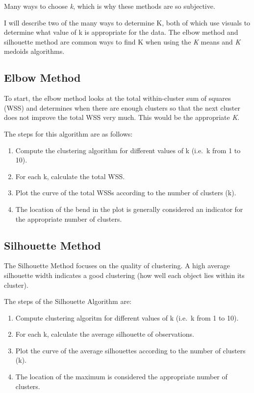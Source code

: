 \documentclass[12pt,twoside]{amherstthesis}
\providecommand{\tightlist}{%
  \setlength{\itemsep}{0pt}\setlength{\parskip}{0pt}}
\begin{document}
  Many ways to choose \emph{k}, which is why these methods are so
  subjective.
  
  I will describe two of the many ways to determine K, both of which use
  visuals to determine what value of k is appropriate for the data. The
  elbow method and silhouette method are common ways to find K when using
  the \emph{K} means and \emph{K} medoids algorithms.
  
  \subsection{Elbow Method}\label{elbow-method}
  
  To start, the elbow method looks at the total within-cluster sum of
  squares (WSS) and determines when there are enough clusters so that the
  next cluster does not improve the total WSS very much. This would be the
  appropriate \emph{K}.
  
  The steps for this algorithm are as follows:
  
  \begin{enumerate}
  \def\labelenumi{\arabic{enumi}.}
  \tightlist
  \item
    Compute the clustering algorithm for different values of k (i.e.~k
    from 1 to 10).
  \item
    For each k, calculate the total WSS.
  \item
    Plot the curve of the total WSSs according to the number of clusters
    (k).
  \item
    The location of the bend in the plot is generally considered an
    indicator for the appropriate number of clusters.
  \end{enumerate}
  
  \subsection{Silhouette Method}\label{silhouette-method}
  
  The Silhouette Method focuses on the quality of clustering. A high
  average silhouette width indicates a good clustering (how well each
  object lies within its cluster).
  
  The steps of the Silhouette Algorithm are:
  
  \begin{enumerate}
  \def\labelenumi{\arabic{enumi}.}
  \tightlist
  \item
    Compute clustering algoritm for different values of k (i.e.~k from 1
    to 10).
  \item
    For each k, calculate the average silhouette of observations.
  \item
    Plot the curve of the average silhouettes according to the number of
    clusters (k).
  \item
    The location of the maximum is considered the appropriate number of
    clusters.
  \end{enumerate}
  
\end{document}

